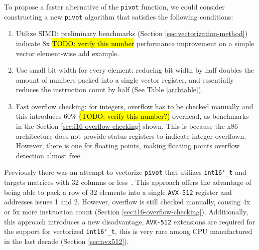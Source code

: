 \documentclass[logo,bsc,singlespacing,parskip]{infthesis}
\newcommand{\dtshort}{\texttt{int16\char`_t}}
\begin{document}
To propose a faster alternative of the \texttt{pivot} function, we could
consider constructing a new \texttt{pivot} algorithm that satisfies the
following conditions:
\begin{enumerate}

\item Utilize SIMD: preliminary benchmarks (Section
\ref{sec:vectorization-method}) indicate 8x \hl{TODO: verify this number}
performance improvement on a simple vector element-wise add example. 

\item Use small bit width for every element: reducing bit width by half doubles the
amount of numbers packed into a single vector register, and essentially reduces
the instruction count by half (See Table \ref{archtable}). 

\item Fast overflow checking: for integers, overflow has to be checked manually
and this introduces 60\%  \hl{(TODO: verify this number?)} overhead, as
benchmarks in the Section \ref{sec:i16-overflow-checking} shown. This is because
the x86 architecture does not provide status registers to indicate integer
overflown. However, there is one for floating points, making floating points
overflow detection almost free. 

\end{enumerate}


Previously there was an attempt to vectorize \texttt{pivot} that utilizes
\dtshort{} and targets matrices with 32 columns or less~\cite{FPL2}. This
approach offers the advantage of being able to pack a row of 32 elements into a
single \texttt{AVX-512} register and addresses issues 1 and 2. However, overflow
is still checked manually, causing 4x or 5x more instruction count (Section
\ref{sec:i16-overflow-checking}). Additionally, this approach introduces a new
disadvantage, \texttt{AVX-512} extensions are required for the support for
vectorized \dtshort{}, this is very rare among CPU manufactured in the last
decade (Section \ref{sec:avx512}). 
\end{document}
